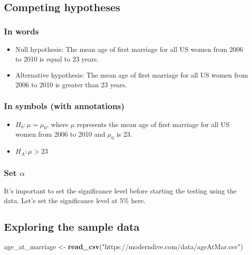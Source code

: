 \documentclass[12pt,]{krantz}
\makeatletter
\newenvironment{Shaded}{\begin{snugshade}}{\end{snugshade}}
\newcommand{\KeywordTok}[1]{\textcolor[rgb]{0.27,0.27,0.27}{\textbf{#1}}}
\newcommand{\StringTok}[1]{\textcolor[rgb]{0.5,0.5,0.5}{#1}}
\newcommand{\NormalTok}[1]{#1}
\providecommand{\tightlist}{%
  \setlength{\itemsep}{0pt}\setlength{\parskip}{0pt}}
\newenvironment{kframe}{%
\medskip{}
\setlength{\fboxsep}{.8em}
 \def\at@end@of@kframe{}%
 \ifinner\ifhmode%
  \def\at@end@of@kframe{\end{minipage}}%
  \begin{minipage}{\columnwidth}%
 \fi\fi%
 \def\FrameCommand##1{\hskip\@totalleftmargin \hskip-\fboxsep
 \colorbox{shadecolor}{##1}\hskip-\fboxsep
     \hskip-\linewidth \hskip-\@totalleftmargin \hskip\columnwidth}%
 \MakeFramed {\advance\hsize-\width
   \@totalleftmargin\z@ \linewidth\hsize
   \@setminipage}}%
 {\par\unskip\endMakeFramed%
 \at@end@of@kframe}
\renewenvironment{Shaded}{\begin{kframe}}{\end{kframe}}
\theoremstyle{definition}
\theoremstyle{definition}
\theoremstyle{definition}
\theoremstyle{remark}
\makeatother
\begin{document}
\subsection{Competing hypotheses}\label{competing-hypotheses}

\subsubsection*{In words}\label{in-words}


\begin{itemize}
\item
  Null hypothesis: The mean age of first marriage for all US women from
  2006 to 2010 is equal to 23 years.
\item
  Alternative hypothesis: The mean age of first marriage for all US
  women from 2006 to 2010 is greater than 23 years.
\end{itemize}

\subsubsection*{In symbols (with
annotations)}\label{in-symbols-with-annotations}


\begin{itemize}
\tightlist
\item
  \(H_0: \mu = \mu_{0}\), where \(\mu\) represents the mean age of first
  marriage for all US women from 2006 to 2010 and \(\mu_0\) is 23.
\item
  \(H_A: \mu > 23\)
\end{itemize}

\subsubsection*{\texorpdfstring{Set
\(\alpha\)}{Set \textbackslash{}alpha}}\label{set-alpha}


It's important to set the significance level before starting the testing
using the data. Let's set the significance level at 5\% here.

\subsection{Exploring the sample data}\label{exploring-the-sample-data}

\begin{Shaded}
\begin{Highlighting}[]
\NormalTok{age_at_marriage <-}\StringTok{ }\KeywordTok{read_csv}\NormalTok{(}\StringTok{"https://moderndive.com/data/ageAtMar.csv"}\NormalTok{)}
\end{Highlighting}
\end{Shaded}
\end{document}
